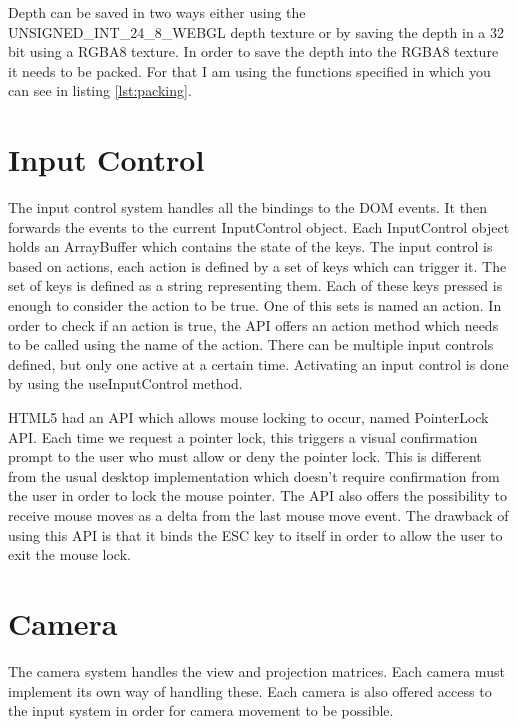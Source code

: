 Depth can be saved in two ways either using the UNSIGNED\_INT\_24\_8\_WEBGL depth texture or by saving the depth in a 32 bit using a RGBA8 texture.
In order to save the depth into the RGBA8 texture it needs to be packed. For that I am using the functions specified in \cite{engel14} which you can see in listing \ref{lst:packing}.

\lstset{caption=RGBA8 packing, label=lst:packing}


\section{Input Control}

The input control system handles all the bindings to the DOM events. It then forwards the events to the current InputControl object. 
Each InputControl object holds an ArrayBuffer which contains the state of the keys. The input control is based on actions, each action is defined by a set of keys which can trigger it. The set of keys is defined as a string representing them. Each of these keys pressed is enough to consider the action to be true. One of this sets is named an action. In order to check if an action is true, the API offers an action method which needs to be called using the name of the action. There can be multiple input controls defined, but only one active at a certain time. Activating an input control is done by using the useInputControl method. 

HTML5 had an API which allows mouse locking to occur, named PointerLock API. Each time we request a pointer lock, this triggers a visual confirmation prompt to the user who must allow or deny the pointer lock. This is different from the usual desktop implementation which doesn't require confirmation from the user in order to lock the mouse pointer.
The API also offers the possibility to receive mouse moves as a delta from the last mouse move event. The drawback of using this API is that it binds the ESC key to itself in order to allow the user to exit the mouse lock. 


\section{Camera}

The camera system handles the view and projection matrices. Each camera must implement its own way of handling these. Each camera is also offered access to the input system in order for camera movement to be possible. 


